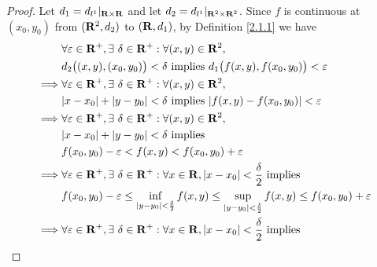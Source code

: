 \begin{proof}
    Let \(d_1 = d_{l^1}|_{\mathbf{R} \times \mathbf{R}}\) and let \(d_2 = d_{l^1}|_{\mathbf{R}^2 \times \mathbf{R}^2}\).
    Since \(f\) is continuous at \((x_0, y_0)\) from \((\mathbf{R}^2, d_2)\) to \((\mathbf{R}, d_1)\), by Definition \ref{2.1.1} we have
    \begin{align*}
                 & \forall \varepsilon \in \R^+, \exists\ \delta \in \R^+ : \forall (x, y) \in \R^2,                                                                                            \\
                 & d_2\big((x, y), (x_0, y_0)\big) < \delta \text{ implies } d_1\big(f(x, y), f(x_0, y_0)\big) < \varepsilon                                                                    \\
        \implies & \forall \varepsilon \in \R^+, \exists\ \delta \in \R^+ : \forall (x, y) \in \R^2,                                                                                            \\
                 & \abs{x - x_0} + \abs{y - y_0} < \delta \text{ implies } \abs{f(x, y) - f(x_0, y_0)} < \varepsilon                                                                            \\
        \implies & \forall \varepsilon \in \R^+, \exists\ \delta \in \R^+ : \forall (x, y) \in \R^2,                                                                                            \\
                 & \abs{x - x_0} + \abs{y - y_0} < \delta \text{ implies}                                                                                                                       \\
                 & f(x_0, y_0) - \varepsilon < f(x, y) < f(x_0, y_0) + \varepsilon                                                                                                              \\
        \implies & \forall \varepsilon \in \R^+, \exists\ \delta \in \R^+ : \forall x \in \R, \abs{x - x_0} < \frac{\delta}{2} \text{ implies}                                                  \\
                 & f(x_0, y_0) - \varepsilon \leq \inf_{\abs{y - y_0} < \frac{\delta}{2}} f(x, y) \leq \sup_{\abs{y - y_0} < \frac{\delta}{2}} f(x, y) \leq f(x_0, y_0) + \varepsilon           \\
        \implies & \forall \varepsilon \in \R^+, \exists\ \delta \in \R^+ : \forall x \in \R, \abs{x - x_0} < \frac{\delta}{2} \text{ implies}                                                  \\

\end{align*}
\end{proof}
